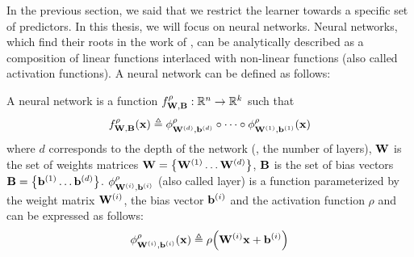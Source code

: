 




In the previous section, we said that we restrict the learner towards a specific set of predictors.
In this thesis, we will focus on neural networks. 
Neural networks, which find their roots in the work of \citet{mcculloch1943logical,rosenblatt1958perceptron}, can be analytically described as a composition of linear functions interlaced with non-linear functions (also called activation functions).
A neural network can be defined as follows:

\begin{definition}
  A neural network is a function $f^{\rho}_{\mathbf{W}, \mathbf{B}} : \mathbb{R}^{n} \rightarrow \mathbb{R}^{k}$ such that
  \begin{equation}
    f^{\rho}_{\mathbf{W},\mathbf{B}}(\mathbf{x}) \triangleq \phi^{\rho}_{\mathbf{W}^{(d)}, \mathbf{b}^{(d)}} \circ \cdots \circ \phi^{\rho}_{\mathbf{W}^{(1)}, \mathbf{b}^{(1)}}(\mathbf{x})
  \end{equation}
  where $d$ corresponds to the depth of the network (\ie, the number of layers), $\mathbf{W}$ is the set of weights matrices $\Wmat = \left\{ \Wmat^{(1)} \dots \Wmat^{(d)} \right\}$, $\mathbf{B}$ is the set of bias vectors $\Bmat = \left\{ \bvec^{(1)} \dots \bvec^{(d)} \right\}$. 
  $\phi^{\rho}_{\mathbf{W}^{(i)},\mathbf{b}^{(i)}}$ (also called layer) is a function parameterized by the weight matrix $\mathbf{W}^{(i)}$, the bias vector $\mathbf{b}^{(i)}$ and the activation function $\rho$ and can be expressed as follows: 
  \begin{equation}
    \phi^{\rho}_{\Wmat^{(i)},\bvec^{(i)}} (\xvec) \triangleq \rho\left(\Wmat^{(i)}\xvec + \bvec^{(i)}\right)
  \end{equation}
\end{definition}








